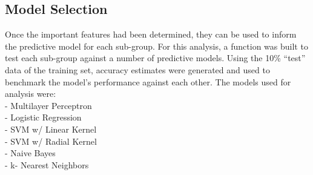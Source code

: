 \documentclass[
]{article}
\begin{document}
\hypertarget{model-selection}{%
\subsection{Model Selection}\label{model-selection}}

Once the important features had been determined, they can be used to inform the predictive model for each sub-group.
For this analysis, a function was built to test each sub-group against a number of predictive models. Using the 10\% ``test'' data of the training set, accuracy estimates were generated and used to benchmark the model's performance against each other. The models used for analysis were:\\
- Multilayer Perceptron\\
- Logistic Regression\\
- SVM w/ Linear Kernel\\
- SVM w/ Radial Kernel\\
- Naive Bayes\\
- k- Nearest Neighbors
\end{document}
